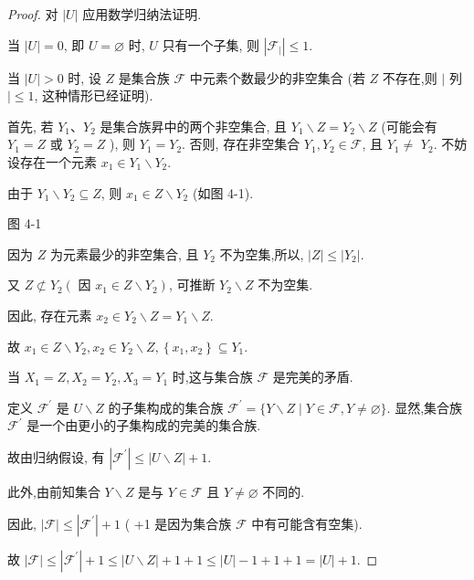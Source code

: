 \begin{proof}
	对 $|U|$ 应用数学归纳法证明.

	当 $|U|=0$, 即 $U=\varnothing$ 时, $U$ 只有一个子集, 则 $\left|\mathscr{F}_{\mid}\right| \leqslant 1$.

	当 $|U|>0$ 时, 设 $Z$ 是集合族 $\mathscr{F}$ 中元素个数最少的非空集合 (若 $Z$ 不存在,则 $\mid$ 列 $\mid \leqslant 1$, 这种情形已经证明).

	首先, 若 $Y_{1} 、 Y_{2}$ 是集合族昇中的两个非空集合, 且 $Y_{1} \backslash Z=Y_{2} \backslash Z$ (可能会有 $Y_{1}=Z$ 或 $Y_{2}=Z$ ), 则 $Y_{1}=Y_{2}$. 否则, 存在非空集合 $Y_{1}, Y_{2} \in \mathscr{F}$, 且 $Y_{1} \neq$ $Y_{2}$. 不妨设存在一个元素 $x_{1} \in Y_{1} \backslash Y_{2}$.

	由于 $Y_{1} \backslash Y_{2} \subseteq Z$, 则 $x_{1} \in Z \backslash Y_{2}$ (如图 4-1).


	图 4-1

	因为 $Z$ 为元素最少的非空集合, 且 $Y_{2}$ 不为空集,所以, $|Z| \leqslant\left|Y_{2}\right|$.

	又 $Z \not \subset Y_{2}\left(\right.$ 因 $\left.x_{1} \in Z \backslash Y_{2}\right)$, 可推断 $Y_{2} \backslash Z$ 不为空集.

	因此, 存在元素 $x_{2} \in Y_{2} \backslash Z=Y_{1} \backslash Z$.

	故 $x_{1} \in Z \backslash Y_{2}, x_{2} \in Y_{2} \backslash Z,\left\{x_{1}, x_{2}\right\} \subseteq Y_{1}$.

	当 $X_{1}=Z, X_{2}=Y_{2}, X_{3}=Y_{1}$ 时,这与集合族 $\mathscr{F}$ 是完美的矛盾.

	定义 $\mathscr{F}^{\prime}$ 是 $U \backslash Z$ 的子集构成的集合族 $\mathscr{F}^{\prime}=\{Y \backslash Z \mid Y \in \mathscr{F}, Y \neq \varnothing\}$. 显然,集合族 $\mathscr{F}^{\prime}$ 是一个由更小的子集构成的完美的集合族.

	故由归纳假设, 有 $\left|\mathscr{F}^{\prime}\right| \leqslant|U \backslash Z|+1$.

	此外,由前知集合 $Y \backslash Z$ 是与 $Y \in \mathscr{F}$ 且 $Y \neq \varnothing$ 不同的.

	因此, $|\mathscr{F}| \leqslant\left|\mathscr{F}^{\prime}\right|+1$ ( +1 是因为集合族 $\mathscr{F}$ 中有可能含有空集).

	故 $|\mathscr{F}| \leqslant\left|\mathscr{F}^{\prime}\right|+1 \leqslant|U \backslash Z|+1+1 \leqslant|U|-1+1+1=|U|+1$.
\end{proof}

